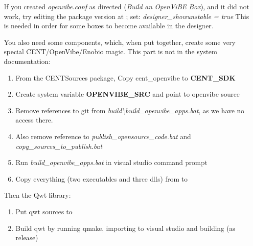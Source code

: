 \documentclass[letterpaper,10pt,english]{sphinxmanual}
\begin{document}
If you created \emph{openvibe.conf} as directed ({\hyperref[index:build-ov-box]{\emph{Build an OpenViBE Box}}}), and it did not work, try editing the package version at ; set: \emph{designer\_showunstable = true}
This is needed in order for some boxes to become available in the designer.

You also need some components, which, when put together, create some very special CENT/OpenVibe/Enobio magic. This part is not in the system documentation:
\begin{enumerate}
\item {} 
From the CENTSources package, Copy cent\_openvibe to \textbf{CENT\_SDK}

\item {} 
Create system variable \textbf{OPENVIBE\_SRC} and point to openvibe source

\item {} 
Remove references to git from \emph{build\textbackslash{}build\_openvibe\_apps.bat}, as we have no access there.

\item {} 
Also remove reference to \emph{publish\_opensource\_code.bat} and \emph{copy\_sources\_to\_publish.bat}

\item {} 
Run \emph{build\_openvibe\_apps.bat} in visual studio command prompt

\item {} 
Copy everything (two executables and three dlls) from  to 

\end{enumerate}

Then the Qwt library:
\begin{enumerate}
\item {} 
Put qwt sources to 

\item {} 
Build qwt by running qmake, importing to visual studio and building (as release)

\end{enumerate}
\end{document}
